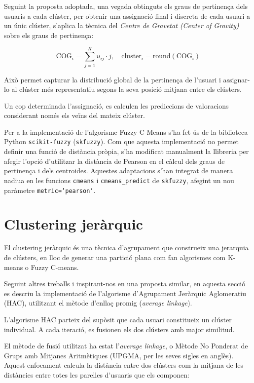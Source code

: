 \documentclass[a4paper,12pt]{report}
\begin{document}
Seguint la proposta adoptada, una vegada obtinguts els graus de pertinença dels usuaris a cada clúster, per obtenir una assignació final i discreta de cada usuari a un únic clúster, s’aplica la tècnica del \textit{Centre de Gravetat (Center of Gravity)} sobre els graus de pertinença:

\[
\text{COG}_i = \sum_{j=1}^{K} u_{ij} \cdot j, \quad \text{cluster}_i = \text{round}(\text{COG}_i)
\]

Això permet capturar la distribució global de la pertinença de l’usuari i assignar-lo al clúster més representatiu segons la seva posició mitjana entre els clústers.

Un cop determinada l’assignació, es calculen les prediccions de valoracions considerant només els veïns del mateix clúster.

Per a la implementació de l’algorisme Fuzzy C-Means s'ha fet ús de la biblioteca Python \texttt{scikit-fuzzy} (\texttt{skfuzzy}). Com que aquesta implementació no permet definir una funció de distància pròpia, s'ha modificat manualment la llibreria per afegir l'opció d'utilitzar la distància de Pearson en el càlcul dels graus de pertinença i dels centroides. Aquestes adaptacions s'han integrat de manera nadiua en les funcions \texttt{cmeans} i \texttt{cmeans\_predict} de \texttt{skfuzzy}, afegint un nou paràmetre \texttt{metric='pearson'}.

\section{Clustering jeràrquic}

El clustering jeràrquic és una tècnica d’agrupament que construeix una jerarquia de clústers, en lloc de generar una partició plana com fan algorismes com K-means o Fuzzy C-means.

Seguint altres treballs \cite{chalco2019hierarchical} i inspirant-nos en una proposta similar, en aquesta secció es descriu la implementació de l’algorisme d’Agrupament Jeràrquic Aglomeratiu (HAC), utilitzant el mètode d’enllaç promig (\textit{average linkage}).

L’algorisme HAC parteix del supòsit que cada usuari constitueix un clúster individual. A cada iteració, es fusionen els dos clústers amb major similitud.

El mètode de fusió utilitzat ha estat l’\textit{average linkage}, o Mètode No Ponderat de Grups amb Mitjanes Aritmètiques (UPGMA, per les seves sigles en anglès). Aquest enfocament calcula la distància entre dos clústers com la mitjana de les distàncies entre totes les parelles d’usuaris que els componen:
\end{document}
